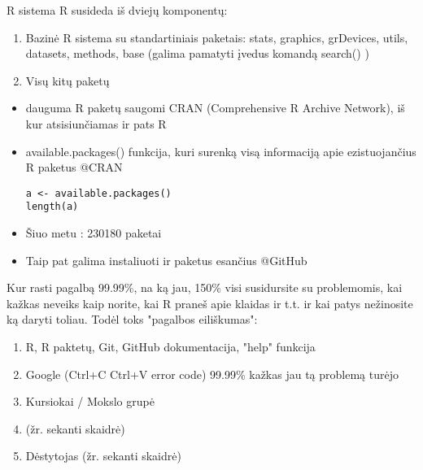 \documentclass[11pt,xcolor=table]{beamer}
\begin{document}

\begin{frame}[fragile]{R sistema}
R susideda iš dviejų komponentų:
\begin{enumerate}
\item Bazinė R sistema su standartiniais paketais: stats, graphics, grDevices, utils, datasets, methods, base  (galima pamatyti įvedus komandą search() )
\item Visų kitų paketų
\end{enumerate}
\begin{itemize}
\item dauguma R paketų saugomi CRAN (Comprehensive R Archive Network), iš kur atsisiunčiamas ir pats R
\item available.packages() funkcija, kuri surenką visą informaciją apie ezistuojančius R paketus @CRAN
\begin{lstlisting}
a <- available.packages()
length(a)
\end{lstlisting}
\item Šiuo metu : 230180 paketai
\item Taip pat galima instaliuoti ir paketus esančius @GitHub
\end{itemize}
\end{frame}


\begin{frame}{Kur rasti pagalbą}
99.99\%, na ką jau, 150\% visi susidursite su problemomis, kai kažkas neveiks kaip norite, kai R praneš apie klaidas ir t.t. ir kai patys nežinosite ką daryti toliau. Todėl toks "pagalbos eiliškumas": 
\begin{enumerate}
\item R, R paktetų, Git, GitHub dokumentacija, "help" funkcija
\item Google (Ctrl+C Ctrl+V error code) 99.99\% kažkas jau tą problemą turėjo
\item Kursiokai / Mokslo grupė
\item \href{https://stackoverflow.com/}{\color{blue}{https://stackoverflow.com/}} (žr. sekanti skaidrė)
\item Dėstytojas (žr. sekanti skaidrė)
\end{enumerate}
\end{frame}


\end{document}
